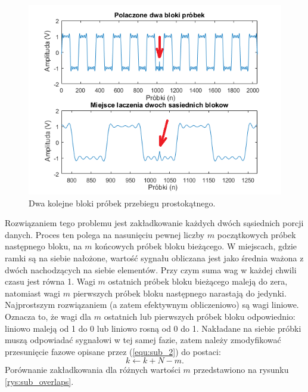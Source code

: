 \begin{figure}[H]
	\centering
	\includegraphics[width=12cm]{grafiki/sub_zakladkowania_brak}
	\captionsetup{justification=centering}
	\caption{Dwa kolejne bloki próbek przebiegu prostokątnego.}
	\label{rys:sub_zakladkowania_brak}
\end{figure}
Rozwiązaniem tego problemu jest zakładkowanie każdych dwóch sąsiednich porcji danych. Proces ten polega na nasunięciu pewnej liczby $m$ początkowych próbek następnego bloku, na $m$ końcowych próbek bloku bieżącego. W miejscach, gdzie ramki są na siebie nałożone, wartość sygnału obliczana jest jako średnia ważona z dwóch nachodzących na siebie elementów. Przy czym suma wag w każdej chwili czasu jest równa 1. Wagi $m$ ostatnich próbek bloku bieżącego maleją do zera, natomiast wagi $m$ pierwszych próbek bloku następnego narastają do jedynki. Najprostszym rozwiązaniem (a zatem efektywnym obliczeniowo) są wagi liniowe. Oznacza to, że wagi dla $m$ ostatnich lub pierwszych próbek bloku odpowiednio: liniowo maleją od 1 do 0 lub liniowo rosną od 0 do 1.
Nakładane na siebie próbki muszą odpowiadać sygnałowi w tej samej fazie, zatem należy zmodyfikować przesunięcie fazowe opisane przez (\ref{equ:sub_2}) do postaci:
\begin{equation} \label{equ:sub_4}
k \gets k + N - m.
\end{equation}
Porównanie zakładkowania dla różnych wartości $m$ przedstawiono na rysunku  \ref{rys:sub_overlaps}.
